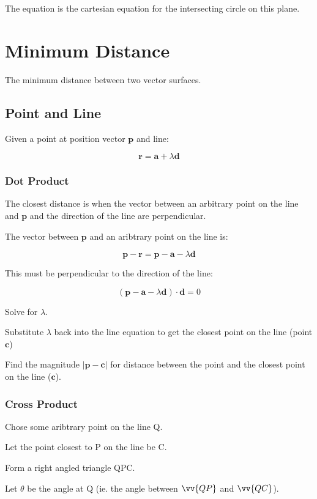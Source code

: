 \documentclass[a4paper,11pt]{report}
\newcommand{\bb}{\boldsymbol}
\begin{document}
The equation is the cartesian equation for the intersecting circle on this
plane.


\section{Minimum Distance}

The minimum distance between two vector surfaces.

\subsection{Point and Line}

Given a point at position vector $\bb{p}$ and line:

$$
\bb{r} = \bb{a} + \lambda \bb{d}
$$

\subsubsection{Dot Product}

The closest distance is when the vector between an arbitrary point on the line
and $\bb{p}$ and the direction of the line are perpendicular.

The vector between $\bb{p}$ and an aribtrary point on the line is:

$$
\bb{p} - \bb{r} = \bb{p} - \bb{a} - \lambda \bb{d}
$$

This must be perpendicular to the direction of the line:

$$
(\bb{p} - \bb{a} - \lambda \bb{d}) \cdot \bb{d} = 0
$$

Solve for $\lambda$.

Substitute $\lambda$ back into the line equation to get the closest point on
the line (point $\bb{c}$)

Find the magnitude $\lvert \bb{p} - \bb{c} \rvert$ for distance between the
point and the closest point on the line ($\bb{c}$).

\subsubsection{Cross Product}

Chose some aribtrary point on the line Q.

Let the point closest to P on the line be C.

Form a right angled triangle QPC.

Let $\theta$ be the angle at Q (ie. the angle between $\vv{QP}$ and
$\vv{QC}$).
\end{document}
